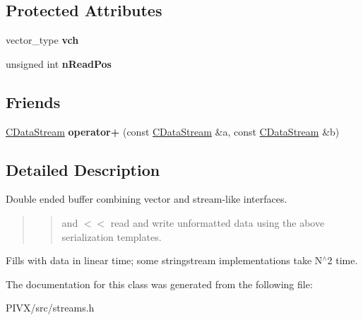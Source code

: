 \subsection*{Protected Attributes}
\begin{DoxyCompactItemize}
\item 
\mbox{\label{class_c_data_stream_ac875adb8c720c48abd1a7c82f3452dda}} 
vector\+\_\+type {\bfseries vch}
\item 
\mbox{\label{class_c_data_stream_af1c6a23b6725406d8f3464036a595556}} 
unsigned int {\bfseries n\+Read\+Pos}
\end{DoxyCompactItemize}
\subsection*{Friends}
\begin{DoxyCompactItemize}
\item 
\mbox{\label{class_c_data_stream_ae9d127e586618900bc753dfda97e9401}} 
\mbox{\hyperlink{class_c_data_stream}{C\+Data\+Stream}} {\bfseries operator+} (const \mbox{\hyperlink{class_c_data_stream}{C\+Data\+Stream}} \&a, const \mbox{\hyperlink{class_c_data_stream}{C\+Data\+Stream}} \&b)
\end{DoxyCompactItemize}


\subsection{Detailed Description}
Double ended buffer combining vector and stream-\/like interfaces.

\begin{quote}
\begin{quote}
and $<$$<$ read and write unformatted data using the above serialization templates. \end{quote}
\end{quote}
Fills with data in linear time; some stringstream implementations take N$^\wedge$2 time. 

The documentation for this class was generated from the following file\+:\begin{DoxyCompactItemize}
\item 
P\+I\+V\+X/src/streams.\+h\end{DoxyCompactItemize}
